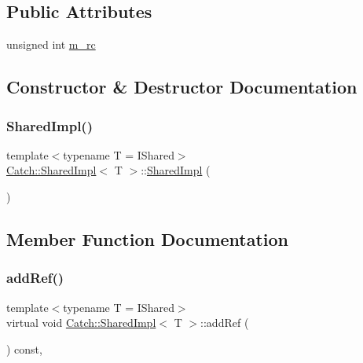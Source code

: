 \subsection*{Public Attributes}
\begin{DoxyCompactItemize}
\item 
unsigned int \hyperlink{struct_catch_1_1_shared_impl_a7e71ef1985b85aa41a1632f932a96bcb}{m\+\_\+rc}
\end{DoxyCompactItemize}


\subsection{Constructor \& Destructor Documentation}
\hypertarget{struct_catch_1_1_shared_impl_a0629856ee353298b61ad52cf60e716fb}{}\label{struct_catch_1_1_shared_impl_a0629856ee353298b61ad52cf60e716fb} 
\subsubsection{\texorpdfstring{Shared\+Impl()}{SharedImpl()}}
{\footnotesize\ttfamily template$<$typename T = I\+Shared$>$ \\
\hyperlink{struct_catch_1_1_shared_impl}{Catch\+::\+Shared\+Impl}$<$ T $>$\+::\hyperlink{struct_catch_1_1_shared_impl}{Shared\+Impl} (\begin{DoxyParamCaption}{ }\end{DoxyParamCaption})\hspace{0.3cm}{\ttfamily [inline]}}



\subsection{Member Function Documentation}
\hypertarget{struct_catch_1_1_shared_impl_a5d1a4c96e8fc07c821890fd09749062e}{}\label{struct_catch_1_1_shared_impl_a5d1a4c96e8fc07c821890fd09749062e} 
\subsubsection{\texorpdfstring{add\+Ref()}{addRef()}}
{\footnotesize\ttfamily template$<$typename T = I\+Shared$>$ \\
virtual void \hyperlink{struct_catch_1_1_shared_impl}{Catch\+::\+Shared\+Impl}$<$ T $>$\+::add\+Ref (\begin{DoxyParamCaption}{ }\end{DoxyParamCaption}) const\hspace{0.3cm}{\ttfamily [inline]}, {\ttfamily [virtual]}}

